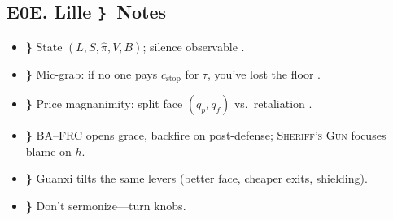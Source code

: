 \documentclass[11pt]{article}
\newcommand{\rbraceglyph}{\texorpdfstring{\texttt{\}}}{\}}}
\theoremstyle{definition}
\newcommand{\BAFRC}{\textsc{BA--FRC}} %
\newcommand{\Sheriff}{\textsc{Sheriff's Gun}}
\begin{document}
\subsection*{E0\textendash E. Lille \rbraceglyph\ Notes}
\begin{itemize}[leftmargin=2em]
\item \textbf{\}} State $(L,S,\hat\pi,V,B)$; silence observable \citep{noelleneumann1974}.
\item \textbf{\}} Mic\hyp grab: if no one pays $c_{\text{stop}}$ for $\tau$, you've lost the floor \citep{salganik2006}.
\item \textbf{\}} Price magnanimity: split face $(q_p,q_f)$ vs.\ retaliation \citep{salmivalli2010,huitsing2014,goffman1955}.
\item \textbf{\}} \BAFRC{} opens grace, backfire on post\hyp defense; \Sheriff{} focuses blame on $h$.
\item \textbf{\}} Guanxi tilts the same levers (better face, cheaper exits, shielding).
\item \textbf{\}} Don't sermonize---turn knobs.
\end{itemize}
\end{document}

